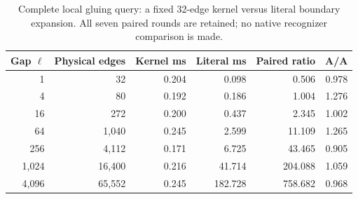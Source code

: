 \begin{table}[htbp]\centering\small
\begin{tabular}{@{}rrrrrr@{}}\toprule
Gap $\ell$ & Physical edges & Kernel ms & Literal ms & Paired ratio & A/A \\\midrule
1 & 32 & 0.204 & 0.098 & 0.506 & 0.978 \\
4 & 80 & 0.192 & 0.186 & 1.004 & 1.276 \\
16 & 272 & 0.200 & 0.437 & 2.345 & 1.002 \\
64 & 1,040 & 0.245 & 2.599 & 11.109 & 1.265 \\
256 & 4,112 & 0.171 & 6.725 & 43.465 & 0.905 \\
1,024 & 16,400 & 0.216 & 41.714 & 204.088 & 1.059 \\
4,096 & 65,552 & 0.245 & 182.728 & 758.682 & 0.968 \\
\bottomrule\end{tabular}
\caption{Complete local gluing query: a fixed 32-edge kernel versus literal boundary expansion. All seven paired rounds are retained; no native recognizer comparison is made.}
\label{tab:benchmark}\end{table}
